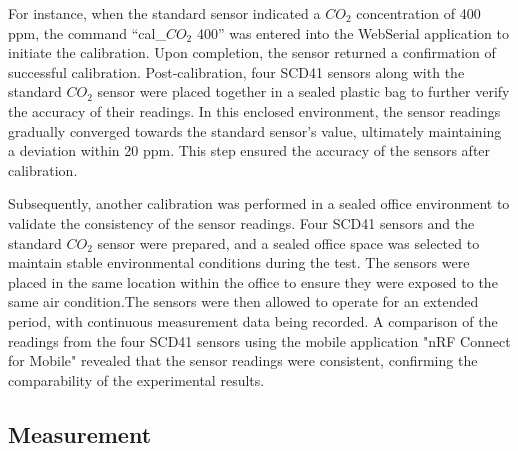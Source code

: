 \documentclass[preprint,12pt]{elsarticle}
\begin{document}
    For instance, when the standard sensor indicated a $CO_2$ concentration of 400 ppm\cite{29}, the command “cal\_$CO_2$ 400” was entered into the WebSerial application to initiate the calibration. Upon completion, the sensor returned a confirmation of successful calibration. Post-calibration, four SCD41 sensors along with the standard $CO_2$ sensor were placed together in a sealed plastic bag to further verify the accuracy of their readings. In this enclosed environment, the sensor readings gradually converged towards the standard sensor's value, ultimately maintaining a deviation within 20 ppm. This step ensured the accuracy of the sensors after calibration. 
    
    Subsequently, another calibration was performed in a sealed office environment to validate the consistency of the sensor readings. Four SCD41 sensors and the standard $CO_2$ sensor were prepared, and a sealed office space was selected to maintain stable environmental conditions during the test. The sensors were placed in the same location within the office to ensure they were exposed to the same air condition.The sensors were then allowed to operate for an extended period, with continuous measurement data being recorded. A comparison of the readings from the four SCD41 sensors using the mobile application "nRF Connect for Mobile" revealed that the sensor readings were consistent, confirming the comparability of the experimental results. 

\subsection{Measurement}
\end{document}
